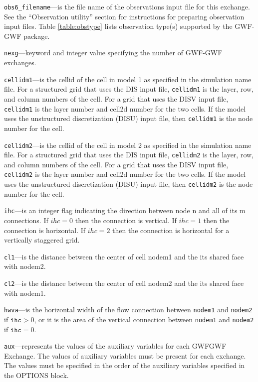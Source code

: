 \item \texttt{obs6\_filename}---is the file name of the observations input file for this exchange. See the ``Observation utility'' section for instructions for preparing observation input files. Table \ref{table:obstype} lists observation type(s) supported by the GWF-GWF package.

\item \texttt{nexg}---keyword and integer value specifying the number of GWF-GWF exchanges.

\item \texttt{cellidm1}---is the cellid of the cell in model 1 as specified in the simulation name file. For a structured grid that uses the DIS input file, \texttt{cellidm1} is the layer, row, and column numbers of the cell.   For a grid that uses the DISV input file, \texttt{cellidm1} is the layer number and cell2d number for the two cells.  If the model uses the unstructured discretization (DISU) input file, then \texttt{cellidm1} is the node number for the cell.

\item \texttt{cellidm2}---is the cellid of the cell in model 2 as specified in the simulation name file. For a structured grid that uses the DIS input file, \texttt{cellidm2} is the layer, row, and column numbers of the cell.   For a grid that uses the DISV input file, \texttt{cellidm2} is the layer number and cell2d number for the two cells.  If the model uses the unstructured discretization (DISU) input file, then \texttt{cellidm2} is the node number for the cell.

\item \texttt{ihc}---is an integer flag indicating the direction between node n and all of its m connections. If $ihc=0$ then the connection is vertical.  If $ihc=1$ then the connection is horizontal. If $ihc=2$ then the connection is horizontal for a vertically staggered grid.

\item \texttt{cl1}---is the distance between the center of cell nodem1 and the its shared face with nodem2.

\item \texttt{cl2}---is the distance between the center of cell nodem2 and the its shared face with nodem1.

\item \texttt{hwva}---is the horizontal width of the flow connection between \texttt{nodem1} and \texttt{nodem2} if $\texttt{ihc} > 0$, or it is the area of the vertical connection between \texttt{nodem1} and \texttt{nodem2} if $\texttt{ihc} = 0$.

\item \texttt{aux}---represents the values of the auxiliary variables for each GWFGWF Exchange. The values of auxiliary variables must be present for each exchange. The values must be specified in the order of the auxiliary variables specified in the OPTIONS block.


